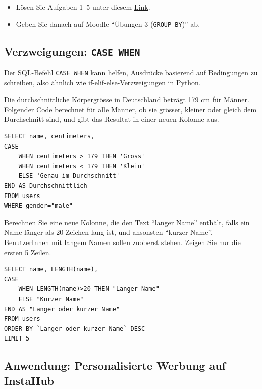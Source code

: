 \begin{myexercise}
  \begin{itemize}
    \item Lösen Sie Aufgaben 1--5 unter diesem \href{https://sql-tutorial.de/home/uebungen.php?lektion=4}{Link}.
    \item Geben Sie danach auf Moodle \enquote{Übungen 3 (\lstinline|GROUP BY|)} ab.
  \end{itemize}
\end{myexercise}

\subsection{Verzweigungen: \texorpdfstring{\lstinline|CASE WHEN|}{CASE WHEN}}

Der SQL-Befehl \lstinline|CASE WHEN| kann helfen, Ausdrücke basierend auf Bedingungen zu schreiben, also ähnlich wie if-elif-else-Verzweigungen in Python.

\begin{myexample}
Die durchschnittliche Körpergrösse in Deutschland beträgt 179 cm für Männer. Folgender Code berechnet für alle Männer, ob sie grösser, kleiner oder gleich dem Durchschnitt sind, und gibt das Resultat in einer neuen Kolonne aus.

\begin{lstlisting}
SELECT name, centimeters,
CASE 
	WHEN centimeters > 179 THEN 'Gross'
    WHEN centimeters < 179 THEN 'Klein'
    ELSE 'Genau im Durchschnitt'
END AS Durchschnittlich
FROM users
WHERE gender="male"
\end{lstlisting}
\end{myexample}

\begin{myexercise}
  Berechnen Sie eine neue Kolonne, die den Text \enquote{langer Name} enthält, falls ein Name länger als 20 Zeichen lang ist, und ansonsten \enquote{kurzer Name}. BenutzerInnen mit langem Namen sollen zuoberst stehen. Zeigen Sie nur die ersten 5 Zeilen.
  \begin{myanswer}
    \begin{lstlisting}
SELECT name, LENGTH(name),
CASE
	WHEN LENGTH(name)>20 THEN "Langer Name"
    ELSE "Kurzer Name"
END AS "Langer oder kurzer Name"
FROM users
ORDER BY `Langer oder kurzer Name` DESC
LIMIT 5
\end{lstlisting}
  \end{myanswer}
\end{myexercise}

\subsection{Anwendung: Personalisierte Werbung auf InstaHub}

